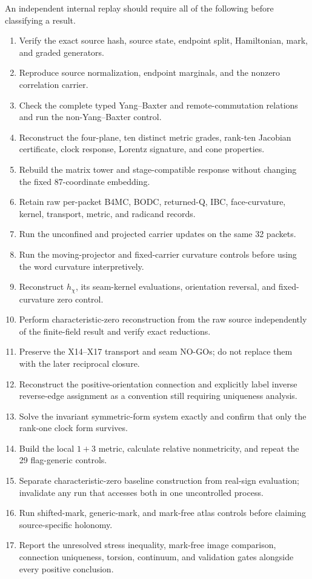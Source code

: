 \documentclass[12pt,a4paper,twoside]{article}
\begin{document}
An independent internal replay should require all of the following before classifying a result.

\begin{enumerate}
  \item Verify the exact source hash, source state, endpoint split, Hamiltonian, mark, and graded generators.
  \item Reproduce source normalization, endpoint marginals, and the nonzero correlation carrier.
  \item Check the complete typed Yang--Baxter and remote-commutation relations and run the non-Yang--Baxter control.
  \item Reconstruct the four-plane, ten distinct metric grades, rank-ten Jacobian certificate, clock response, Lorentz signature, and cone properties.
  \item Rebuild the matrix tower and stage-compatible response without changing the fixed 87-coordinate embedding.
  \item Retain raw per-packet B4MC, BODC, returned-Q, IBC, face-curvature, kernel, transport, metric, and radicand records.
  \item Run the unconfined and projected carrier updates on the same 32 packets.
  \item Run the moving-projector and fixed-carrier curvature controls before using the word curvature interpretively.
  \item Reconstruct $h_\chi$, its seam-kernel evaluations, orientation reversal, and fixed-curvature zero control.
  \item Perform characteristic-zero reconstruction from the raw source independently of the finite-field result and verify exact reductions.
  \item Preserve the X14--X17 transport and seam NO-GOs; do not replace them with the later reciprocal closure.
  \item Reconstruct the positive-orientation connection and explicitly label inverse reverse-edge assignment as a convention still requiring uniqueness analysis.
  \item Solve the invariant symmetric-form system exactly and confirm that only the rank-one clock form survives.
  \item Build the local $1+3$ metric, calculate relative nonmetricity, and repeat the 29 flag-generic controls.
  \item Separate characteristic-zero baseline construction from real-sign evaluation; invalidate any run that accesses both in one uncontrolled process.
  \item Run shifted-mark, generic-mark, and mark-free atlas controls before claiming source-specific holonomy.
  \item Report the unresolved stress inequality, mark-free image comparison, connection uniqueness, torsion, continuum, and validation gates alongside every positive conclusion.
\end{enumerate}
\end{document}
